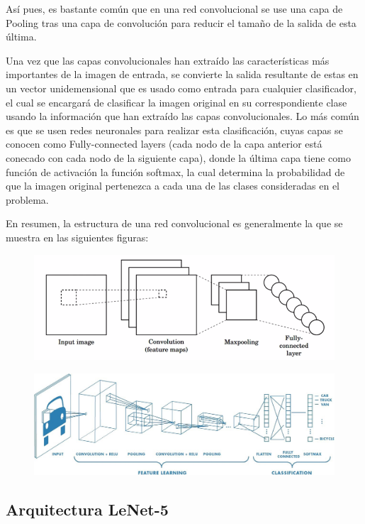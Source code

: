 \documentclass[a4paper,11pt]{article}
\begin{document}
Así pues, es bastante común que en una red convolucional se use una capa de Pooling tras una capa de convolución para reducir el tamaño de la salida de esta última. 

Una vez que las capas convolucionales han extraído las características más importantes de la imagen de entrada, se convierte la salida resultante de estas en un vector unidemensional que es usado como entrada para cualquier clasificador, el cual se encargará de clasificar la imagen original en su correspondiente clase usando la información que han extraído las capas convolucionales. Lo más común es que se usen redes neuronales para realizar esta clasificación, cuyas capas se conocen como Fully-connected layers (cada nodo de la capa anterior está conecado con cada nodo de la siguiente capa), donde la última capa tiene como función de activación la función softmax, la cual determina la probabilidad de que la imagen original pertenezca a cada una de las clases consideradas en el problema. 

En resumen, la estructura de una red convolucional es generalmente la que se muestra en las siguientes figuras:
\begin{figure}[H]
	\centering
	\includegraphics[width=1\linewidth]{img/con7}
	\caption{}
	\label{fig:con7}
\end{figure}
\begin{figure}[H]
	\centering
	\includegraphics[width=1\linewidth]{img/conv6}
	\caption{}
	\label{fig:cov5}
\end{figure}

\subsection{Arquitectura LeNet-5}
\end{document}
